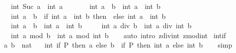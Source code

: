 \begin{isabellebody}
\ \ \ \ \ {\isachardoublequoteopen}int\ {\isacharparenleft}{\kern0pt}Suc\ a{\isacharparenright}{\kern0pt}\ {\isacharequal}{\kern0pt}\ int\ a\ {\isacharplus}{\kern0pt}\ {}{\isachardoublequoteclose}\isanewline
\ \ \ \ \ {\isachardoublequoteopen}int\ {\isacharparenleft}{\kern0pt}a\ {\isacharplus}{\kern0pt}\ b{\isacharparenright}{\kern0pt}\ {\isacharequal}{\kern0pt}\ int\ a\ {\isacharplus}{\kern0pt}\ int\ b{\isachardoublequoteclose}\isanewline
\ \ \ \ \ {\isachardoublequoteopen}int\ {\isacharparenleft}{\kern0pt}a\ {\isacharminus}{\kern0pt}\ b{\isacharparenright}{\kern0pt}\ {\isacharequal}{\kern0pt}\ {\isacharparenleft}{\kern0pt}if\ int\ a\ {\isacharless}{\kern0pt}\ int\ b\ then\ {}\ else\ int\ a\ {\isacharminus}{\kern0pt}\ int\ b{\isacharparenright}{\kern0pt}{\isachardoublequoteclose}\isanewline
\ \ \ \ \ {\isachardoublequoteopen}int\ {\isacharparenleft}{\kern0pt}a\ {\isacharasterisk}{\kern0pt}\ b{\isacharparenright}{\kern0pt}\ {\isacharequal}{\kern0pt}\ int\ a\ {\isacharasterisk}{\kern0pt}\ int\ b{\isachardoublequoteclose}\isanewline
\ \ \ \ \ {\isachardoublequoteopen}int\ {\isacharparenleft}{\kern0pt}a\ div\ b{\isacharparenright}{\kern0pt}\ {\isacharequal}{\kern0pt}\ int\ a\ div\ int\ b{\isachardoublequoteclose}\isanewline
\ \ \ \ \ {\isachardoublequoteopen}int\ {\isacharparenleft}{\kern0pt}a\ mod\ b{\isacharparenright}{\kern0pt}\ {\isacharequal}{\kern0pt}\ int\ a\ mod\ int\ b{\isachardoublequoteclose}\isanewline
%
\isadelimproof
\ \ %
\endisadelimproof
%
\isatagproof
{}\isamarkupfalse%
\ {\isacharparenleft}{\kern0pt}auto\ intro{\isacharcolon}{\kern0pt}\ zdiv{\isacharunderscore}{\kern0pt}int\ zmod{\isacharunderscore}{\kern0pt}int{\isacharparenright}{\kern0pt}%
\endisatagproof
{\isafoldproof}%
%
\isadelimproof
\isanewline
%
\endisadelimproof
\isanewline
{}\isamarkupfalse%
\ int{\isacharunderscore}{\kern0pt}if{\isacharcolon}{\kern0pt}\isanewline
\ \ \ a\ b\ {\isacharcolon}{\kern0pt}{\isacharcolon}{\kern0pt}\ nat\isanewline
\ \ \ {\isachardoublequoteopen}int\ {\isacharparenleft}{\kern0pt}if\ P\ then\ a\ else\ b{\isacharparenright}{\kern0pt}\ {\isacharequal}{\kern0pt}\ {\isacharparenleft}{\kern0pt}if\ P\ then\ int\ a\ else\ int\ b{\isacharparenright}{\kern0pt}{\isachardoublequoteclose}\isanewline
%
\isadelimproof
\ \ %
\endisadelimproof
%
\isatagproof
{}\isamarkupfalse%
\ simp%
\endisatagproof
{\isafoldproof}%
%
\isadelimproof
%
\endisadelimproof
%
\isadelimdocument

\end{isabellebody}
